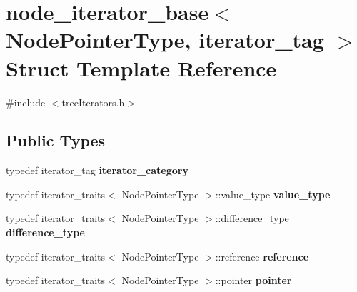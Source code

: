 \hypertarget{structnode__iterator__base}{}\section{node\+\_\+iterator\+\_\+base$<$ Node\+Pointer\+Type, iterator\+\_\+tag $>$ Struct Template Reference}
\label{structnode__iterator__base}


{\ttfamily \#include $<$tree\+Iterators.\+h$>$}

\subsection*{Public Types}
\begin{DoxyCompactItemize}
\item 
\mbox{\label{structnode__iterator__base_a190420c84495834019391df273681ea8}} 
typedef iterator\+\_\+tag {\bfseries iterator\+\_\+category}
\item 
\mbox{\label{structnode__iterator__base_a509bb24455d4a0f3a14a008d71d321c7}} 
typedef iterator\+\_\+traits$<$ Node\+Pointer\+Type $>$\+::value\+\_\+type {\bfseries value\+\_\+type}
\item 
\mbox{\label{structnode__iterator__base_a879171e7ae0df6fec22182a696f6c0c8}} 
typedef iterator\+\_\+traits$<$ Node\+Pointer\+Type $>$\+::difference\+\_\+type {\bfseries difference\+\_\+type}
\item 
\mbox{\label{structnode__iterator__base_a732fdf5171d3d678390af66f8f33f599}} 
typedef iterator\+\_\+traits$<$ Node\+Pointer\+Type $>$\+::reference {\bfseries reference}
\item 
\mbox{\label{structnode__iterator__base_a131ea813ccffd76d838894bd0d04c1bb}} 
typedef iterator\+\_\+traits$<$ Node\+Pointer\+Type $>$\+::pointer {\bfseries pointer}
\end{DoxyCompactItemize}
